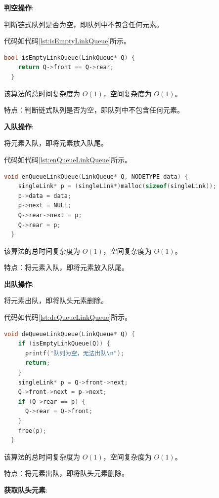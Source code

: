 \documentclass[lang=cn,newtx,10pt,scheme=chinese]{../elegantbook}
\begin{document}
\textbf{判空操作}:

判断链式队列是否为空，即队列中不包含任何元素。

代码如代码\ref{lst:isEmptyLinkQueue}所示。

\begin{lstlisting}[language=C++, caption={判断链式队列是否为空示例代码}, label={lst:isEmptyLinkQueue}]
  bool isEmptyLinkQueue(LinkQueue* Q) {
    return Q->front == Q->rear;
  }

\end{lstlisting}

该算法的总时间复杂度为 $O(1)$，空间复杂度为 $O(1)$。

特点：判断链式队列是否为空，即队列中不包含任何元素。

\textbf{入队操作}:

将元素入队，即将元素放入队尾。

代码如代码\ref{lst:enQueueLinkQueue}所示。

\begin{lstlisting}[language=C++, caption={入队示例代码}, label={lst:enQueueLinkQueue}]
  void enQueueLinkQueue(LinkQueue* Q, NODETYPE data) {
    singleLink* p = (singleLink*)malloc(sizeof(singleLink));
    p->data = data;
    p->next = NULL;
    Q->rear->next = p;
    Q->rear = p;
  }

\end{lstlisting}

该算法的总时间复杂度为 $O(1)$，空间复杂度为 $O(1)$。

特点：将元素入队，即将元素放入队尾。

\textbf{出队操作}:

将元素出队，即将队头元素删除。

代码如代码\ref{lst:deQueueLinkQueue}所示。

\begin{lstlisting}[language=C++, caption={出队示例代码}, label={lst:deQueueLinkQueue}]
  void deQueueLinkQueue(LinkQueue* Q) {
    if (isEmptyLinkQueue(Q)) {
      printf("队列为空，无法出队\n");
      return;
    }
    singleLink* p = Q->front->next;
    Q->front->next = p->next;
    if (Q->rear == p) {
      Q->rear = Q->front;
    }
    free(p);
  }

\end{lstlisting}

该算法的总时间复杂度为 $O(1)$，空间复杂度为 $O(1)$。

特点：将元素出队，即将队头元素删除。

\textbf{获取队头元素}:
\end{document}
